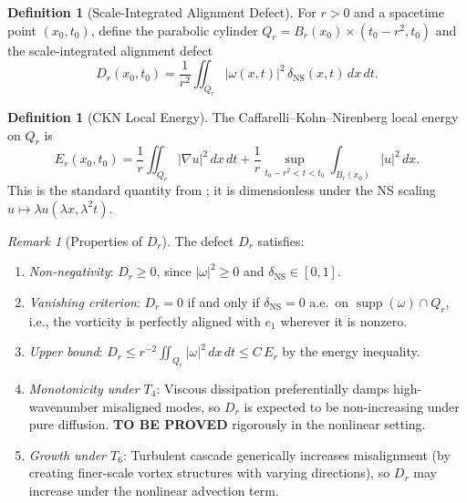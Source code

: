 \documentclass[11pt]{article}
\theoremstyle{definition}
\newtheorem{definition}[theorem]{Definition}
\theoremstyle{remark}
\newtheorem{remark}[theorem]{Remark}
\DeclareMathOperator{\supp}{supp}
\begin{document}
\begin{definition}[Scale-Integrated Alignment Defect]
\label{def:Dr}
For $r > 0$ and a spacetime point $(x_0, t_0)$, define the parabolic cylinder
$Q_r = B_r(x_0) \times (t_0 - r^2, t_0)$ and the scale-integrated alignment defect
\begin{equation}\label{eq:Dr}
  D_r(x_0, t_0) = \frac{1}{r^2}\iint_{Q_r} |\omega(x,t)|^2\,
  \delta_{\mathrm{NS}}(x,t)\, dx\, dt.
\end{equation}
\end{definition}

\begin{definition}[CKN Local Energy]
\label{def:Er}
The Caffarelli--Kohn--Nirenberg local energy on $Q_r$ is
\begin{equation}\label{eq:Er}
  E_r(x_0, t_0) = \frac{1}{r}\iint_{Q_r} |\nabla u|^2\, dx\, dt
  + \frac{1}{r}\sup_{t_0 - r^2 < t < t_0}\int_{B_r(x_0)} |u|^2\, dx.
\end{equation}
This is the standard quantity from \cite{CKN}; it is dimensionless under the
NS scaling $u \mapsto \lambda u(\lambda x, \lambda^2 t)$.
\end{definition}

\begin{remark}[Properties of $D_r$]
The defect $D_r$ satisfies:
\begin{enumerate}[nosep]
  \item \emph{Non-negativity}: $D_r \geq 0$, since $|\omega|^2 \geq 0$ and
    $\delta_{\mathrm{NS}} \in [0,1]$.
  \item \emph{Vanishing criterion}: $D_r = 0$ if and only if
    $\delta_{\mathrm{NS}} = 0$ a.e.\ on $\supp(\omega) \cap Q_r$, i.e., the
    vorticity is perfectly aligned with $e_1$ wherever it is nonzero.
  \item \emph{Upper bound}: $D_r \leq r^{-2}\iint_{Q_r} |\omega|^2\, dx\, dt
    \leq C\, E_r$ by the energy inequality.
  \item \emph{Monotonicity under $T_4$}: Viscous dissipation preferentially damps
    high-wavenumber misaligned modes, so $D_r$ is expected to be non-increasing
    under pure diffusion.  \textbf{TO BE PROVED} rigorously in the nonlinear setting.
  \item \emph{Growth under $T_6$}: Turbulent cascade generically increases
    misalignment (by creating finer-scale vortex structures with varying directions),
    so $D_r$ may increase under the nonlinear advection term.
\end{enumerate}
\end{remark}
\end{document}
